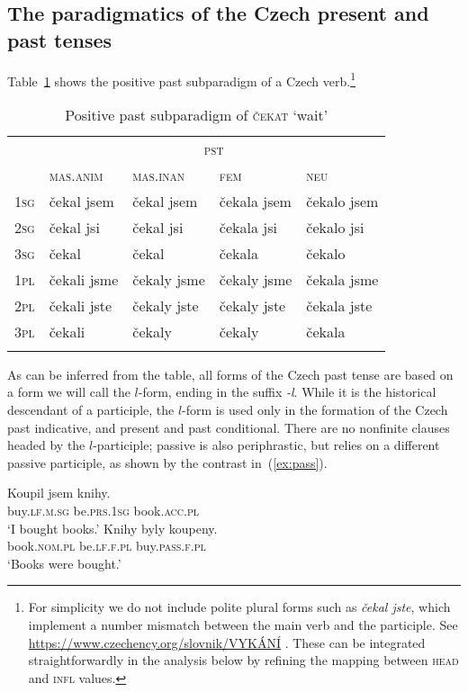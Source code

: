 \documentclass[output=paper]{langsci/langscibook}
\begin{document}
\subsection{The paradigmatics of the Czech present and past tenses}

Table~\ref{tab:pst} shows the positive past subparadigm of a Czech verb.\footnote{For simplicity we do not include polite plural forms such as \emph{\v{c}ekal jste}, which implement a number mismatch between the main verb and the participle. See \url{https://www.czechency.org/slovnik/VYKÁNÍ} \citep{Karlik16}. These can be integrated straightforwardly in the analysis below by refining the mapping between \textsc{head} and \textsc{infl} values.}

\begin{table}
\begin{tabular}{lllll}
\lsptoprule
& \multicolumn{4}{c}{\scshape pst}\\
& \scshape mas.anim & \scshape mas.inan & \scshape fem & \scshape neu\\
\midrule
\scshape 1sg & \v{c}ekal jsem  & \v{c}ekal jsem &  \v{c}ekala jsem &  \v{c}ekalo jsem\\ 
\scshape 2sg & \v{c}ekal jsi & \v{c}ekal jsi  &  \v{c}ekala jsi&  \v{c}ekalo jsi\\ 
\scshape 3sg &  \v{c}ekal &  \v{c}ekal &  \v{c}ekala &  \v{c}ekalo\\ 
\scshape 1pl & \v{c}ekali jsme & \v{c}ekaly jsme &  \v{c}ekaly jsme &  \v{c}ekala jsme\\
\scshape 2pl &  \v{c}ekali jste &  \v{c}ekaly jste&  \v{c}ekaly jste&  \v{c}ekala jste\\
\scshape 3pl &  \v{c}ekali &  \v{c}ekaly &  \v{c}ekaly &  \v{c}ekala\\
\lspbottomrule
\end{tabular}
\caption{Positive past subparadigm of \textsc{\v{c}ekat} ‘wait’\label{tab:pst}}
\end{table}
As can be inferred from the table, 
all forms of the Czech past tense are based on a form we will call the $l$-form, ending in the suffix \emph{-l}. While it is the historical descendant of a participle, the $l$-form is used only in the formation of the Czech past indicative, and present and past conditional. There are no nonfinite clauses headed by the $l$-participle; passive is also periphrastic, but relies on a different passive participle, as shown by the contrast in~(\ref{ex:pass}). 

\begin{exe}
\ex\label{ex:pass}\begin{xlist}
\ex\gll Koupil jsem knihy.\\
buy.\textsc{lf.m.sg} be.\textsc{prs.1sg} book.\textsc{acc.pl}\\
\glt ‘I bought books.’
\ex\gll Knihy byly koupeny.\\
book.\textsc{nom.pl} be.\textsc{lf.f.pl} buy.\textsc{pass.f.pl}\\
\glt ‘Books were bought.’
\end{xlist}
\end{exe} 
\end{document}
